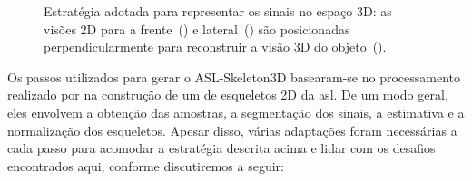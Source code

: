 \begin{figure}[ht!]
    \centering
    \caption{\textmd{Estratégia adotada para representar os sinais no espaço 3D: as visões 2D para a frente~() e lateral~() são posicionadas perpendicularmente para reconstruir a visão 3D do objeto~().}}
    \hfill
    \hfill
    \nomefonte{}
    \label{fig:our-strategy-3d}
\end{figure}


Os passos utilizados para gerar o ASL-Skeleton3D basearam-se no processamento realizado por  na construção de um \dataset de esqueletos 2D da \acrshort{asl}. De um modo geral, eles envolvem a obtenção das amostras, a segmentação dos sinais, a estimativa e a normalização dos esqueletos. Apesar disso, várias adaptações foram necessárias a cada passo para acomodar a estratégia descrita acima e lidar com os desafios encontrados aqui, conforme discutiremos a seguir:

